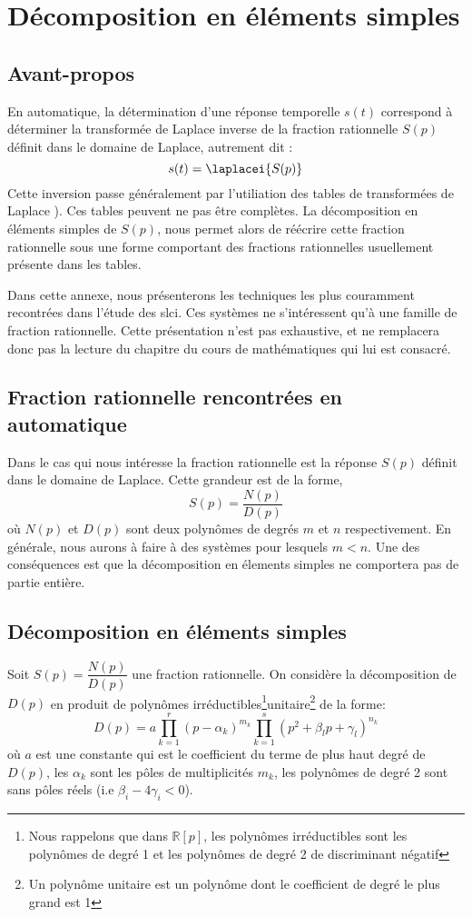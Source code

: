 \chapter{Décomposition en éléments simples\label{annexe-DES}}

\section{Avant-propos}
En automatique, la détermination d'une réponse temporelle $s(t)$
correspond à déterminer la transformée 
de Laplace inverse de la fraction rationnelle $S(p)$ 
définit dans le domaine de Laplace, autrement dit :
$$
s(t)=\laplacei{S(p)}
$$
Cette inversion passe généralement par l'utiliation des tables de transformées de Laplace ).
Ces tables peuvent ne pas être complètes. La décomposition en 
éléments simples de $S(p)$, nous permet alors de 
réécrire cette fraction rationnelle sous une forme comportant 
des fractions rationnelles usuellement présente dans les tables.

Dans cette annexe, nous présenterons les techniques les plus couramment
recontrées dans l'étude des \gls{slci}. Ces systèmes ne s'intéressent qu'à 
une famille de fraction rationnelle.
Cette présentation n'est pas exhaustive, et ne remplacera donc 
pas la lecture du chapitre du cours de mathématiques qui lui est consacré.

\section{Fraction rationnelle rencontrées en automatique}
Dans le cas qui nous intéresse la fraction rationnelle est la réponse $S(p)$ 
définit dans le domaine de Laplace.
Cette grandeur est de la forme,
$$
S(p)=\dfrac{N(p)}{D(p)}
$$
où $N(p)$ et $D(p)$ sont deux polynômes de degrés $m$ et $n$ respectivement.
En générale, nous aurons à faire à des systèmes pour lesquels $m<n$. 
Une des conséquences est que la décomposition en élements simples ne comportera
pas de partie entière.

\section{Décomposition en éléments simples}

Soit $S(p)=\dfrac{N(p)}{D(p)}$ une fraction rationnelle. On considère la décomposition 
de $D(p)$ en produit de polynômes irréductibles\footnote{Nous rappelons que 
dans $\mathbb{R}[p]$, les polynômes irréductibles sont 
les polynômes de degré 1 et les polynômes de degré 2 de discriminant négatif}unitaire\footnote{Un polynôme 
unitaire est un polynôme dont le coefficient de degré le plus grand est 1}
de la forme:
$$
D(p)=a\prod_{k=1}^r(p-\alpha_k)^{m_k}\prod_{k=1}^s(p^2+\beta_lp+\gamma_l)^{n_k}
$$
où $a$ est une constante qui est le coefficient du terme de plus haut degré de $D(p)$, les $\alpha_k$
sont les pôles de multiplicités $m_k$,  les polynômes de degré 2 sont sans pôles réels (i.e $\beta_i-4\gamma_i<0$).

